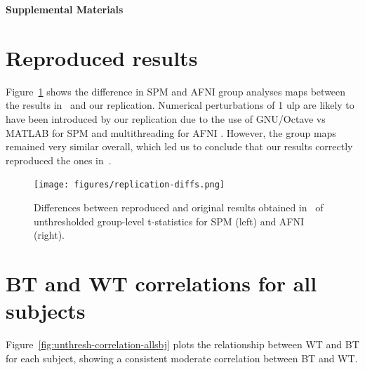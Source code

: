 \documentclass[11pt,onecolumn]{article}
\begin{document}



\clearpage

\setcounter{equation}{0}
\setcounter{figure}{0}
\setcounter{table}{0}
\setcounter{section}{0}

\makeatletter
\renewcommand{\theequation}{S\arabic{equation}}
\renewcommand{\thefigure}{S\arabic{figure}}
\renewcommand{\thesection}{S\arabic{section}}

\textbf{\centering \Large Supplemental Materials}

\section{Reproduced results}
\label{sec:supp-repro}

Figure~\ref{fig:replication-diff} shows the difference in SPM and AFNI
group analyses maps between the results in~\cite{bowring2019exploring} and
our replication. Numerical perturbations of 1 ulp are likely to have been
introduced by our replication due to the use of GNU/Octave vs MATLAB for SPM
and multithreading for AFNI . However, the group maps remained very similar
overall, which led us to conclude that our results correctly reproduced
the ones in~\cite{bowring2019exploring}.
\begin{figure}[ht]
  \texttt{[image: figures/replication-diffs.png]}
  \caption{Differences between reproduced and original results obtained in~\cite{bowring2019exploring}
    of unthresholded group-level t-statistics for SPM (left) and AFNI (right). }
  \label{fig:replication-diff}
\end{figure}

\section{BT and WT correlations for all subjects}
\label{sec:supp-subjects}

Figure~\ref{fig:unthresh-correlation-allsbj} plots the relationship between
WT and BT for each subject, showing a consistent moderate correlation between BT and
WT.
\end{document}
